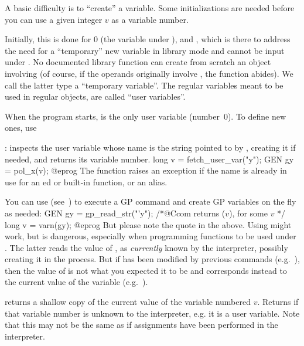  A basic difficulty is to ``create'' a variable.
Some initializations are needed before you can use a given integer $v$ as a
variable number.

Initially, this is done for $0$ (the variable  under ), and
, which is there to address the need for a ``temporary'' new
variable in library mode and cannot be input under . No documented
library function can create from scratch an object involving 
(of course, if the operands originally involve , the function
abides). We call the latter type a ``temporary variable''. The regular
variables meant to be used in regular objects, are called ``user
variables''.

 When the program starts,
 is the only user variable (number~$0$). To define new ones, use

: inspects the user variable whose name is
the string pointed to by , creating it if needed, and returns its
variable number.
\bprog
long v = fetch_user_var("y");
GEN gy = pol_x(v);
@eprog\noindent
The function raises an exception if the name is already in use for an
ed or built-in function, or an alias.

 You can use 
(see~) to execute a GP command and create GP
variables on the fly as needed:
\bprog
GEN gy = gp_read_str("'y"); /*@Ccom returns ($v$), for some $v$ */
long v = varn(gy);
@eprog\noindent
But please note the quote  in the above. Using 
might work, but is dangerous, especially when programming functions to
be used under . The latter reads the value of , as
\emph{currently} known by the  interpreter, possibly creating it
in the process. But if  has been modified by previous 
commands (e.g.~), then the value of  is not what you
expected it to be and corresponds instead to the current value of the
 variable (e.g.~).

 returns a shallow copy of the current
value of the variable numbered $v$. Returns  if that variable
number is unknown to the interpreter,  e.g. it is a user variable. Note
that this may not be the same as  if assignments have been
performed in the interpreter.


